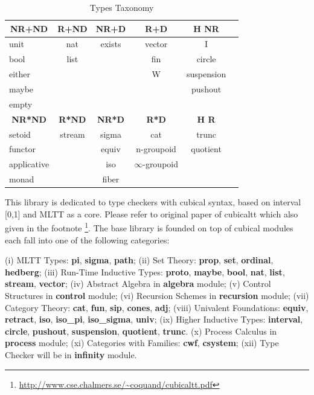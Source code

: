 \documentclass{article}
\newcommand*{\thead}[1]{\multicolumn{1}{c}{\bfseries #1}}
\begin{document}
\begin{table}[h]
\centering
\caption{Types Taxonomy}
\label{tab:a}
\begin{tabular}{lccccc}
\hline
\thead{NR+ND} & \thead{R+ND} & \thead{NR+D} & \thead{R+D} & \thead{H NR}\\
\hline
unit        & nat    & exists  & vector & I \\
bool        & list   &         & fin    & circle \\
either      &        &         & W      & suspension \\
maybe       &        &         &        & pushout \\
empty       &        &         &        & \\
\hline
\thead{NR*ND} & \thead{R*ND} & \thead{NR*D} & \thead{R*D} &\thead{H R}\\
\hline
setoid      & stream & sigma   & cat               & trunc \\
functor     &        & equiv   & n-groupoid        & quotient \\
applicative &        & iso     & $\infty$-groupoid & \\
monad       &        & fiber   &                   & \\
\end{tabular}
\end{table}


This library is dedicated to type checkers with cubical syntax,
based on interval [0,1] and MLTT as a core.
Please refer to original paper of cubicaltt \cite{Mortberg17}
which also given in the footnote \footnote{\url{http://www.cse.chalmers.se/~coquand/cubicaltt.pdf}}.
The base library is founded on top of cubical modules each
fall into one of the following categories:

(i) MLTT Types: {\bf pi}, {\bf sigma}, {\bf path};
(ii) Set Theory: {\bf prop}, {\bf set}, {\bf ordinal}, {\bf hedberg};
(iii) Run-Time Inductive Types: {\bf proto}, {\bf maybe}, {\bf bool}, {\bf nat}, {\bf list}, {\bf stream}, {\bf vector};
(iv) Abstract Algebra in {\bf algebra} module;
(v) Control Structures in {\bf control} module;
(vi) Recursion Schemes in {\bf recursion} module;
(vii) Category Theory: {\bf cat}, {\bf fun}, {\bf sip}, {\bf cones}, {\bf adj};
(viii) Univalent Foundations: {\bf equiv}, {\bf retract}, {\bf iso}, {\bf iso\_pi}, {\bf iso\_sigma}, {\bf univ};
(ix) Higher Inductive Types: {\bf interval}, {\bf circle}, {\bf pushout}, {\bf suspension}, {\bf quotient}, {\bf trunc}.
(x) Process Calculus in {\bf process} module;
(xi) Categories with Families: {\bf cwf}, {\bf csystem};
(xii) Type Checker will be in {\bf infinity} module.
\end{document}
